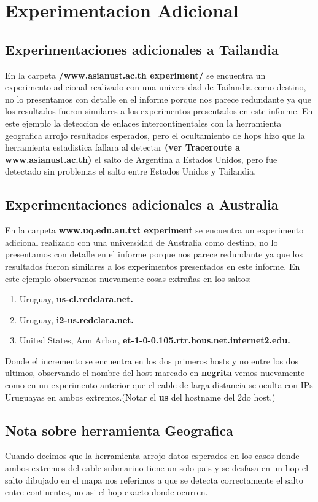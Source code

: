 \section{Experimentacion Adicional}
\subsection{Experimentaciones adicionales a Tailandia}
En la carpeta \textbf{/www.asianust.ac.th experiment/} se encuentra un experimento adicional realizado con una universidad de Tailandia como destino, no lo presentamos con detalle en el informe porque nos parece redundante ya que los resultados fueron similares a los experimentos presentados en este informe. En este ejemplo la deteccion de enlaces intercontinentales con la herramienta geografica arrojo resultados esperados, pero el ocultamiento de hops hizo que la herramienta estadistica fallara al detectar \textbf{(ver Traceroute a www.asianust.ac.th)} el salto de Argentina a Estados Unidos, pero fue detectado sin problemas el salto entre Estados Unidos y Tailandia.

\subsection{Experimentaciones adicionales a Australia}
En la carpeta \textbf{www.uq.edu.au.txt experiment} se encuentra un experimento adicional realizado con una universidad de Australia como destino, no lo presentamos con detalle en el informe porque nos parece redundante ya que los resultados fueron similares a los experimentos presentados en este informe. En este ejemplo observamos nuevamente cosas extrañas en los saltos:
\begin{enumerate}
	\item Uruguay, \textbf{us-cl.redclara.net.}
	\item Uruguay, \textbf{i2-us.redclara.net.}
	\item United States, Ann Arbor, \textbf{et-1-0-0.105.rtr.hous.net.internet2.edu.}
\end{enumerate}
Donde el incremento se encuentra en los dos primeros hosts y no entre los dos ultimos, observando el nombre del host marcado en \textbf{negrita} vemos nuevamente como en un experimento anterior que el cable de larga distancia se oculta con IPs Uruguayas en ambos extremos.(Notar el \textbf{us} del hostname del 2do host.)

\subsection{Nota sobre herramienta Geografica}
Cuando decimos que la herramienta arrojo datos esperados en los casos donde ambos extremos del cable submarino tiene un solo pais y se desfasa en un hop el salto dibujado en el mapa nos referimos a que se detecta correctamente el salto entre continentes, no asi el hop exacto donde ocurren.

